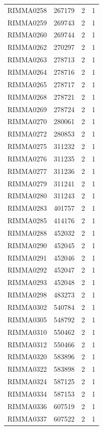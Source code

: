 \documentclass[11pt]{article}
\newcounter{rowno}
\begin{document}
\begin{scriptsize}
\begin{longtable}{>{\stepcounter{rowno}}cccc}
    RIMMA0258 & 267179 & 2     & 1 \\
    RIMMA0259 & 269743 & 2     & 1 \\
    RIMMA0260 & 269744 & 2     & 1 \\
    RIMMA0262 & 270297 & 2     & 1 \\
    RIMMA0263 & 278713 & 2     & 1 \\
    RIMMA0264 & 278716 & 2     & 1 \\
    RIMMA0265 & 278717 & 2     & 1 \\
    RIMMA0268 & 278721 & 2     & 1 \\
    RIMMA0269 & 278724 & 2     & 1 \\
    RIMMA0270 & 280061 & 2     & 1 \\
    RIMMA0272 & 280853 & 2     & 1 \\
    RIMMA0275 & 311232 & 2     & 1 \\
    RIMMA0276 & 311235 & 2     & 1 \\
    RIMMA0277 & 311236 & 2     & 1 \\
    RIMMA0279 & 311241 & 2     & 1 \\
    RIMMA0280 & 311243 & 2     & 1 \\
    RIMMA0283 & 401757 & 2     & 1 \\
    RIMMA0285 & 414176 & 2     & 1 \\
    RIMMA0288 & 452032 & 2     & 1 \\
    RIMMA0290 & 452045 & 2     & 1 \\
    RIMMA0291 & 452046 & 2     & 1 \\
    RIMMA0292 & 452047 & 2     & 1 \\
    RIMMA0293 & 452048 & 2     & 1 \\
    RIMMA0298 & 483273 & 2     & 1 \\
    RIMMA0302 & 540784 & 2     & 1 \\
    RIMMA0305 & 548792 & 2     & 1 \\
    RIMMA0310 & 550462 & 2     & 1 \\
    RIMMA0312 & 550466 & 2     & 1 \\
    RIMMA0320 & 583896 & 2     & 1 \\
    RIMMA0322 & 583898 & 2     & 1 \\
    RIMMA0324 & 587125 & 2     & 1 \\
    RIMMA0334 & 587153 & 2     & 1 \\
    RIMMA0336 & 607519 & 2     & 1 \\
    RIMMA0337 & 607522 & 2     & 1 \\

\end{longtable}
\end{scriptsize}
\end{document}
